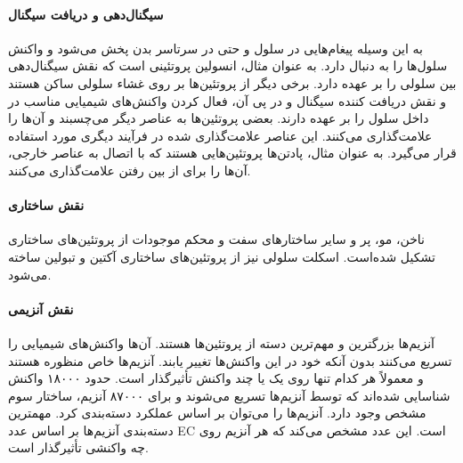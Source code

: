 \paragraph{سیگنال‌دهی و دریافت سیگنال}
به این وسیله پیغام‌هایی در سلول و حتی در سرتاسر بدن پخش می‌شود و واکنش سلول‌ها را به دنبال دارد. به عنوان مثال، انسولین پروتئینی است که نقش سیگنال‌دهی بین سلولی را بر عهده دارد. برخی دیگر از پروتئین‌ها بر روی غشاء سلولی ساکن هستند و نقش دریافت کننده سیگنال و در پی آن، فعال کردن واکنش‌های شیمیایی مناسب در داخل سلول را بر عهده دارند. بعضی پروتئین‌ها به عناصر دیگر می‌چسبند و آن‌ها را علامت‌گذاری می‌کنند. این عناصر علامت‌گذاری شده در فرآیند دیگری مورد استفاده قرار می‌گیرد. به عنوان مثال، پادتن‌ها پروتئین‌هایی هستند که با اتصال به عناصر خارجی، آن‌ها را برای از بین رفتن علامت‌گذاری می‌کنند.

\paragraph{نقش ساختاری}
ناخن، مو، پر و سایر ساختارهای سفت و محکم موجودات از پروتئین‌های ساختاری تشکیل شده‌است. اسکلت سلولی نیز از پروتئین‌های ساختاری آکتین و تبولین ساخته می‌شود.

\paragraph{نقش آنزیمی} 
آنزیم‌ها بزرگترین و مهم‌ترین دسته از پروتئین‌ها هستند. آن‌ها واکنش‌های شیمیایی را تسریع می‌کنند بدون آنکه خود در این واکنش‌ها تغییر یابند. آنزیم‌ها خاص منظوره هستند و معمولاً  هر کدام تنها روی یک یا چند واکنش تأثیرگذار است. حدود ۱۸۰۰۰ واکنش شناسایی شده‌اند که توسط آنزیم‌ها تسریع می‌شوند و برای ۸۷۰۰۰ آنزیم، ساختار سوم مشخص وجود دارد. آنزیم‌ها را می‌توان بر اساس عملکرد دسته‌بندی کرد. مهمترین دسته‌بندی آنزیم‌ها بر اساس عدد EC است. این عدد مشخص می‌کند که هر آنزیم روی چه واکنشی تأثیرگذار است.


